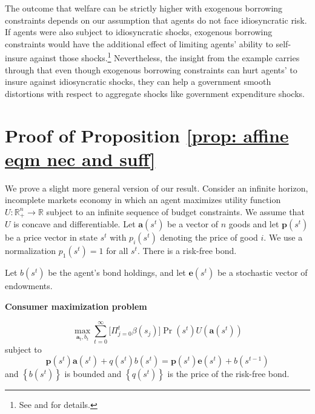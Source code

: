 \documentclass[thmsb,11pt]{article}
\begin{document}
\begin{appendix}
The outcome that welfare can be strictly higher with exogenous borrowing
constraints depends on our assumption that agents do not face idiosyncratic risk. If agents were also subject to idiosyncratic shocks,
exogenous borrowing constraints would have the additional effect of limiting
agents' ability to self-insure against those shocks.\footnote{%
See \cite{Aiyagari1998} and \cite{Heathcote2005} for details.}
Nevertheless, the insight from the example carries through that even though exogenous
borrowing constraints can hurt agents' to insure against idiosyncratic shocks, they
can help a government smooth distortions with respect to aggregate shocks
like government expenditure shocks.



\smallskip
\section{\smallskip Proof of Proposition  \ref{prop: affine eqm nec and suff}}
\label{appndx: affine eqm nec and stuff}
\smallskip

We prove a slight more general version of our result. Consider an infinite
horizon, incomplete markets economy in which an agent maximizes utility
function $U:\mathbb{R}_{+}^{n}\rightarrow \mathbb{R}$ subject to an infinite
sequence of budget constraints. We assume that $U$ is concave and
differentiable. Let $\bm{a}(s^t)$ be a vector of $n$ goods and let $%
\bm{p}(s^{t})$ be a price vector in state $s^{t}$ with $p_{i}(s^{t})$
denoting the price of good $i.$ We use a normalization $p_{1}\left(
s^{t}\right) =1$ for all $s^{t}.$ There is a risk-free bond.

Let $b(s^{t})$ be the agent's bond holdings, and let $\bm{e}\left(
s^{t}\right) $ be a stochastic vector of endowments.

\textbf{Consumer maximization problem}


\begin{equation}
\max_{\bm{a}_{t},b_{t}}\sum_{t=0}^{\infty }\bigl[\Pi_{j=0}^t \beta(s_j)\bigr]\Pr \left(
s^{t}\right) U(\bm{a}\left( s^{t}\right) )
\label{Tech appendix: consumer maximization}
\end{equation}%
subject to%
\begin{equation}
\bm{p}\left( s^{t}\right) \bm{a}\left( s^{t}\right) +q(s^{t})b\left(
s^{t}\right) =\bm{p}\left( s^{t}\right) \bm{e}\left( s^{t}\right)
+b\left( s^{t-1}\right)  \label{Tech appendix: budget constraint}
\end{equation}%
and $\left \{ b\left( s^{t}\right) \right \} $ is bounded and $\left \{
q(s^{t})\right \} $ is the price of the risk-free bond.


\end{appendix}
\end{document}
